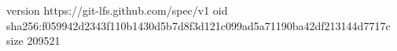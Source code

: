 version https://git-lfs.github.com/spec/v1
oid sha256:f059942d2343f110b1430d5b7d8f3d121c099ad5a71190ba42df213144d7717c
size 209521
